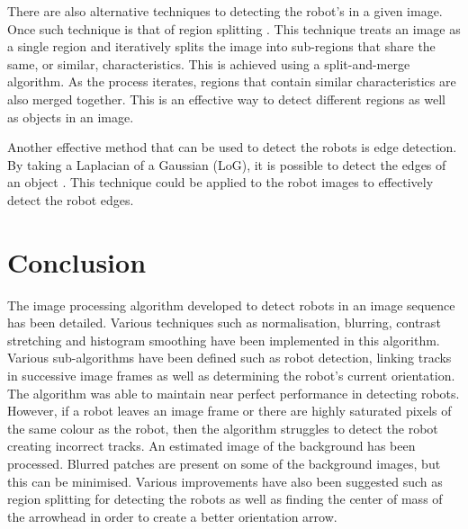 \documentclass{article}
\begin{document}
There are also alternative techniques to detecting the robot's in a given image. Once such technique is that of region splitting \cite{ref:digitalProcessing}. This technique treats an image as a single region and iteratively splits the image into sub-regions that share the same, or similar, characteristics. This is achieved using a split-and-merge algorithm. As the process iterates, regions that contain similar characteristics are also merged together. This is an effective way to detect different regions as well as objects in an image.

Another effective method that can be used to detect the robots is edge detection. By taking a Laplacian of a Gaussian (LoG), it is possible to detect the edges of an object \cite{ref:digitalProcessing}. This technique could be applied to the robot images to effectively detect the robot edges.





\section{Conclusion}
\label{sec:conclusion}
The image processing algorithm developed to detect robots in an image sequence has been detailed. Various techniques such as normalisation, blurring, contrast stretching and histogram smoothing have been implemented in this algorithm. Various sub-algorithms have been defined such as robot detection, linking tracks in successive image frames as well as determining the robot's current orientation. The algorithm was able to maintain near perfect performance in detecting robots. However, if a robot leaves an image frame or there are highly saturated pixels of the same colour as the robot, then the algorithm struggles to detect the robot creating incorrect tracks. An estimated image of the background has been processed. Blurred patches are present on some of the background images, but this can be minimised. Various improvements have also been suggested such as region splitting for detecting the robots as well as finding the center of mass of the arrowhead in order to create a better orientation arrow.
\end{document}
